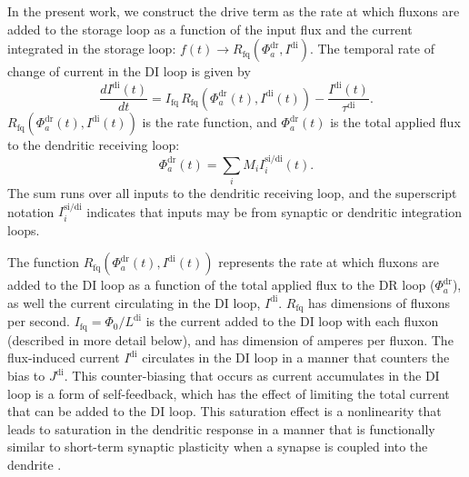 \documentclass[twocolumn]{article}
\begin{document}
In the present work, we construct the drive term as the rate at which fluxons are added to the storage loop as a function of the input flux and the current integrated in the storage loop: $f(t)\rightarrow R_{\mathrm{fq}}(\Phi_a^{\mathrm{dr}},I^{\mathrm{di}})$. The temporal rate of change of current in the DI loop is given by
\begin{equation}
\label{eq:dendrites__leaky_integrator}
\frac{dI^{\mathrm{di}}(t)}{dt} = I_{\mathrm{fq}}\,R_{\mathrm{fq}} \left( \Phi^{\mathrm{dr}}_a(t),I^{\mathrm{di}}(t) \right) - \frac{I^{\mathrm{di}}(t)}{\tau^{\mathrm{di}}}.
\end{equation}
$R_{\mathrm{fq}} \left( \Phi^{\mathrm{dr}}_a(t),I^{\mathrm{di}}(t) \right)$ is the rate function, and $\Phi^{\mathrm{dr}}_a(t)$ is the total applied flux to the dendritic receiving loop:
\begin{equation}
\label{eq:dendrites__applied_flux}
\Phi^{\mathrm{dr}}_a(t) = \sum_i M_i I_i^{\mathrm{si/di}}(t).
\end{equation}
The sum runs over all inputs to the dendritic receiving loop, and the superscript notation $I_i^{\mathrm{si/di}}$ indicates that inputs may be from synaptic or dendritic integration loops.

The function $R_{\mathrm{fq}} \left( \Phi^{\mathrm{dr}}_a(t),I^{\mathrm{di}}(t) \right)$ represents the rate at which fluxons are added to the DI loop as a function of the total applied flux to the DR loop ($\Phi^{\mathrm{dr}}_a$), as well the current circulating in the DI loop, $I^{\mathrm{di}}$. $R_{\mathrm{fq}}$ has dimensions of fluxons per second. $I_{\mathrm{fq}} = \Phi_0/L^{\mathrm{di}}$ is the current added to the DI loop with each fluxon (described in more detail below), and has dimension of amperes per fluxon. The flux-induced current $I^{\mathrm{di}}$ circulates in the DI loop in a manner that counters the bias to $J^{\mathrm{di}}$. This counter-biasing that occurs as current accumulates in the DI loop is a form of self-feedback, which has the effect of limiting the total current that can be added to the DI loop. This saturation effect is a nonlinearity that leads to saturation in the dendritic response in a manner that is functionally similar to short-term synaptic plasticity when a synapse is coupled into the dendrite \cite{sh2020}.
\end{document}
